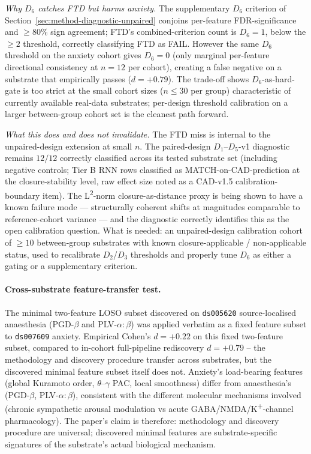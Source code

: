 \documentclass[11pt,a4paper]{article}
\begin{document}
\noindent\emph{Why $D_6$ catches FTD but harms anxiety.} The supplementary $D_6$ criterion of Section~\ref{sec:method-diagnostic-unpaired} conjoins per-feature FDR-significance and $\geq 80\%$ sign agreement; FTD's combined-criterion count is $D_6 = 1$, below the $\geq 2$ threshold, correctly classifying FTD as FAIL. However the same $D_6$ threshold on the anxiety cohort gives $D_6 = 0$ (only marginal per-feature directional consistency at $n = 12$ per cohort), creating a false negative on a substrate that empirically passes ($d = +0.79$). The trade-off shows $D_6$-as-hard-gate is too strict at the small cohort sizes ($n \leq 30$ per group) characteristic of currently available real-data substrates; per-design threshold calibration on a larger between-group cohort set is the cleanest path forward.

\noindent\emph{What this does and does not invalidate.} The FTD miss is internal to the unpaired-design extension at small $n$. The paired-design $D_1$--$D_5$-v1 diagnostic remains $12/12$ correctly classified across its tested substrate set (including negative controls; Tier B RNN rows classified as MATCH-on-CAD-prediction at the closure-stability level, raw effect size noted as a CAD-v1.5 calibration-boundary item). The L\textsuperscript{2}-norm closure-as-distance proxy is being shown to have a known failure mode --- structurally coherent shifts at magnitudes comparable to reference-cohort variance --- and the diagnostic correctly identifies this as the open calibration question. What is needed: an unpaired-design calibration cohort of $\geq 10$ between-group substrates with known closure-applicable / non-applicable status, used to recalibrate $D_2$/$D_3$ thresholds and properly tune $D_6$ as either a gating or a supplementary criterion.

\paragraph{Cross-substrate feature-transfer test.} The minimal two-feature LOSO subset discovered on \texttt{ds005620} source-localised anaesthesia (PGD-$\beta$ and PLV-$\alpha{:}\beta$) was applied verbatim as a fixed feature subset to \texttt{ds007609} anxiety. Empirical Cohen's $d = +0.22$ on this fixed two-feature subset, compared to in-cohort full-pipeline rediscovery $d = +0.79$ -- the methodology and discovery procedure transfer across substrates, but the discovered minimal feature subset itself does not. Anxiety's load-bearing features (global Kuramoto order, $\theta$--$\gamma$ PAC, local smoothness) differ from anaesthesia's (PGD-$\beta$, PLV-$\alpha{:}\beta$), consistent with the different molecular mechanisms involved (chronic sympathetic arousal modulation vs acute GABA/NMDA/K\textsuperscript{+}-channel pharmacology). The paper's claim is therefore: methodology and discovery procedure are universal; discovered minimal features are substrate-specific signatures of the substrate's actual biological mechanism.
\end{document}
